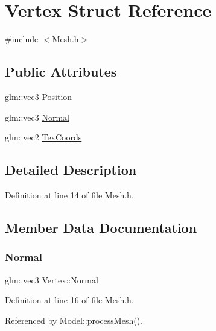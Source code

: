 \hypertarget{structVertex}{}\section{Vertex Struct Reference}
\label{structVertex}


{\ttfamily \#include $<$Mesh.\+h$>$}

\subsection*{Public Attributes}
\begin{DoxyCompactItemize}
\item 
glm\+::vec3 \mbox{\hyperlink{structVertex_abb3cfacd96b5955b0cec9359840ee49f}{Position}}
\item 
glm\+::vec3 \mbox{\hyperlink{structVertex_a9ab4dc431b41509f0b1bb1a4bf09d4e2}{Normal}}
\item 
glm\+::vec2 \mbox{\hyperlink{structVertex_a921a513c1e6d1e63e99d477fa837a317}{Tex\+Coords}}
\end{DoxyCompactItemize}


\subsection{Detailed Description}


Definition at line 14 of file Mesh.\+h.



\subsection{Member Data Documentation}
\mbox{\label{structVertex_a9ab4dc431b41509f0b1bb1a4bf09d4e2}} 
\subsubsection{\texorpdfstring{Normal}{Normal}}
{\footnotesize\ttfamily glm\+::vec3 Vertex\+::\+Normal}



Definition at line 16 of file Mesh.\+h.



Referenced by Model\+::process\+Mesh().

\mbox{\label{structVertex_abb3cfacd96b5955b0cec9359840ee49f}} 
